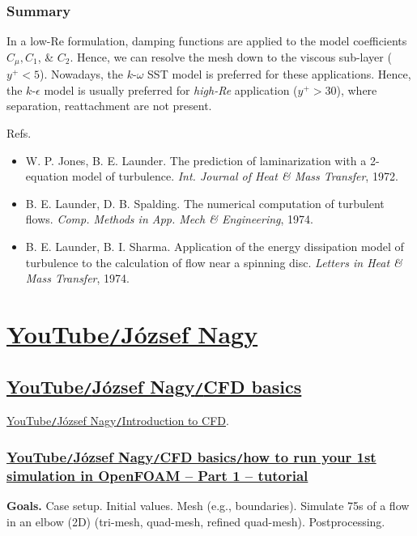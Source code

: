 \documentclass[oneside]{book}
\numberwithin{equation}{section}
\begin{document}
\subsection{Summary}
In a low-Re formulation, damping functions are applied to the model coefficients $C_\mu,C_1$, \& $C_2$. Hence, we can resolve the mesh down to the viscous sub-layer ($y^+ < 5$). Nowadays, the $k$-$\omega$ SST model is preferred for these applications. Hence, the $k$-$\epsilon$ model is usually preferred for \textit{high-Re} application ($y^+ > 30$), where separation, reattachment are not present.

Refs.
\begin{itemize}
	\item W. P. Jones, B. E. Launder. The prediction of laminarization with a 2-equation model of turbulence. \textit{Int. Journal of Heat \& Mass Transfer}, 1972.
	\item B. E. Launder, D. B. Spalding. The numerical computation of turbulent flows. \textit{Comp. Methods in App. Mech \& Engineering}, 1974.
	\item B. E. Launder, B. I. Sharma. Application of the energy dissipation model of turbulence to the calculation of flow near a spinning disc. \textit{Letters in Heat \& Mass Transfer}, 1974.
\end{itemize}


\chapter{\href{https://www.youtube.com/c/J\%C3\%B3zsefNagyOpenFOAMGuru}{YouTube\texttt{/}J\'ozsef Nagy}}

\section{\href{https://www.youtube.com/playlist?list=PLcOe4WUSsMkH6DLHpsYyveaqjKxnEnQqB}{YouTube\texttt{/}J\'ozsef Nagy\texttt{/}CFD basics}}
\href{https://www.youtube.com/watch?v=mGSUIXye9j4}{YouTube\texttt{/}J\'ozsef Nagy\texttt{/}Introduction to CFD}.

\subsection{\href{https://www.youtube.com/watch?v=KznljrgWSvo}{YouTube\texttt{/}J\'ozsef Nagy\texttt{/}CFD basics\texttt{/}how to run your 1st simulation in OpenFOAM -- Part 1 -- tutorial}}
\textbf{Goals.} Case setup. Initial values. Mesh (e.g., boundaries). Simulate 75s of a flow in an elbow (2D) (tri-mesh, quad-mesh, refined quad-mesh). Postprocessing.
\end{document}
